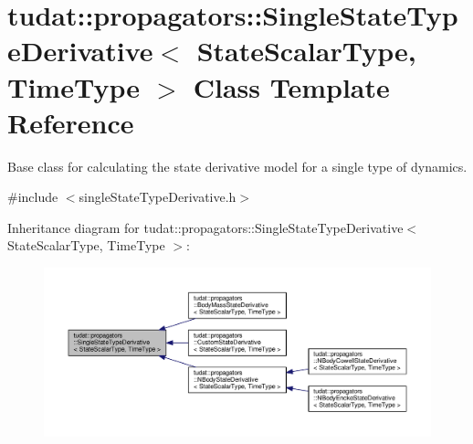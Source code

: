 \hypertarget{classtudat_1_1propagators_1_1SingleStateTypeDerivative}{}\section{tudat\+:\+:propagators\+:\+:Single\+State\+Type\+Derivative$<$ State\+Scalar\+Type, Time\+Type $>$ Class Template Reference}
\label{classtudat_1_1propagators_1_1SingleStateTypeDerivative}


Base class for calculating the state derivative model for a single type of dynamics.  




{\ttfamily \#include $<$single\+State\+Type\+Derivative.\+h$>$}



Inheritance diagram for tudat\+:\+:propagators\+:\+:Single\+State\+Type\+Derivative$<$ State\+Scalar\+Type, Time\+Type $>$\+:
\nopagebreak
\begin{figure}[H]
\begin{center}
\leavevmode
\includegraphics[width=350pt]{classtudat_1_1propagators_1_1SingleStateTypeDerivative__inherit__graph}
\end{center}
\end{figure}
